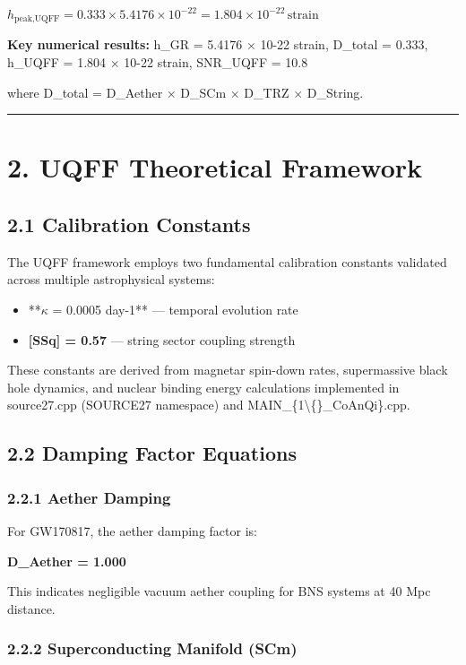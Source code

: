\documentclass[11pt]{article}
\begin{document}
$h_{\text{peak,UQFF}} = 0.333 \times 5.4176 \times 10^{-22} = 1.804 \times 10^{-22}\,\text{strain}$

\textbf{Key numerical results:} h\_GR = 5.4176 $\times$ 10-22 strain, D\_total = 0.333, h\_UQFF = 1.804 $\times$ 10-22 strain, SNR\_UQFF = 10.8

where D\_total = D\_Aether $\times$ D\_SCm $\times$ D\_TRZ $\times$ D\_String.

\noindent\rule{\textwidth}{0.4pt}

\section*{2. UQFF Theoretical Framework}

\subsection*{2.1 Calibration Constants}

The UQFF framework employs two fundamental calibration constants validated across multiple astrophysical systems:

\begin{itemize}
  \item **$\kappa$ = 0.0005 day-1** --- temporal evolution rate
  \item \textbf{[SSq] = 0.57} --- string sector coupling strength
\end{itemize}

These constants are derived from magnetar spin-down rates, supermassive black hole dynamics, and nuclear binding energy calculations implemented in source27.cpp (SOURCE27 namespace) and MAIN\_\{1\textbackslash\{\}\_CoAnQi\}.cpp.

\subsection*{2.2 Damping Factor Equations}

\subsubsection*{2.2.1 Aether Damping}

For GW170817, the aether damping factor is:

\textbf{D\_Aether = 1.000}

This indicates negligible vacuum aether coupling for BNS systems at 40 Mpc distance.

\subsubsection*{2.2.2 Superconducting Manifold (SCm)}
\end{document}
